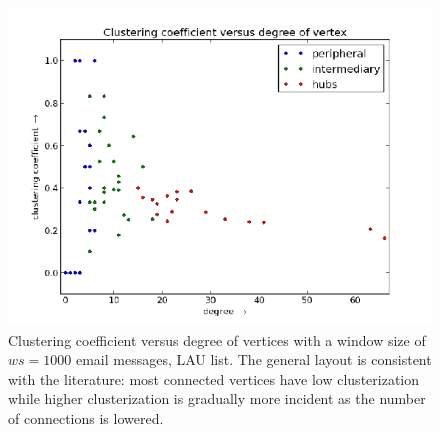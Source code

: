 \documentclass[%
 aip,
 jmp,%
 amsmath,amssymb,
 reprint,%
]{revtex4-1}
\begin{document}
\begin{figure} 
   \centering
        \includegraphics[width=\columnwidth]{figs/ev0pr11CC}
    \caption{Clustering coefficient versus degree of vertices with a window size of $ws = 1000$ email messages, LAU list. The general layout is consistent with the literature: most connected vertices have low clusterization while higher clusterization is gradually more incident as the number of connections is lowered.}
    \label{clust}
\end{figure}
\end{document}

